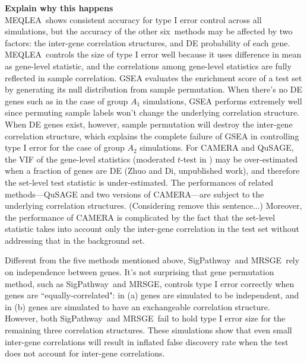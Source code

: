 \documentclass[a4,center,fleqn]{NAR}
\newcommand{\OurMethod}{MEQLEA}
\newcommand{\HowmanyTest}{six}
\newcommand{\aaCase}{a}
\newcommand{\aCase}{c}
\newcommand{\cCase}{b}
\newcommand{\eCase}{d}
\newcommand{\fCase}{e}
\newcommand{\gent}{SigPathway}
\newcommand{\gen}{geneSetTest}
\newcommand{\genr}{MRSGE}
\newcommand{\thepapertobefinished}{Zhuo and Di, unpublished work}
\begin{document}
	\textbf{Explain why this happens}\\
	\OurMethod~shows consistent accuracy for type I error control across all simulations, but the
	accuracy of the other \HowmanyTest~methods may be affected by two factors: the inter-gene
	correlation structures, and DE probability of each gene. \OurMethod~controls the size of type I
	error well because it uses difference in mean as gene-level statistic, and the correlations among
	gene-level statistics are fully reflected in sample correlation. GSEA evaluates the enrichment score
	of a test set by generating its null distribution from sample permutation. When there's no DE genes
	such as in the case of group $A_1$ simulations, GSEA performs extremely well since permuting sample
	labels won't change the underlying correlation structure. When DE genes exist, however, sample
	permutation will destroy the inter-gene correlation structure, which explains the complete failure
	of GSEA in controlling type I error for the case of group $A_2$ simulations. For CAMERA and QuSAGE,
	the VIF of the gene-level statistics (moderated $t$-test in \cite{wu2012camera}) may be
	over-estimated when a fraction of genes are DE (\thepapertobefinished), and therefore the set-level
	test statistic is under-estimated. The performances of related methods---QuSAGE and two versions of
	CAMERA---are subject to the underlying correlation structures. (Considering remove this sentence...)
	Moreover, the performance of CAMERA is complicated by the fact that the set-level statistic takes
	into account only the inter-gene correlation in the test set without addressing that in the
	background set.
	
	Different from the five methods mentioned above, \gent~and \genr~rely on independence between
	genes. It's not surprising that gene permutation method, such as \gent~and \genr, controls type I
	error correctly when genes are ``equally-correlated": in (\aaCase) genes are simulated to be
	independent, and in (\cCase) genes are simulated to have an exchangeable correlation structure.
	However, both \gent~and \genr~fail to hold type I error size for the remaining three correlation
	structures. These simulations show that even small inter-gene correlations will result in inflated
	false discovery rate when the test does not account for inter-gene correlations.  
	
	
\end{document}
